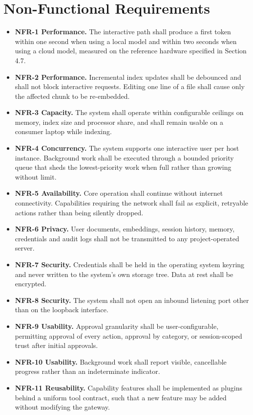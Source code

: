 \documentclass{FastFyp}
\begin{document}
\section{Non-Functional Requirements}
\begin{itemize}
    \item \textbf{NFR-1 Performance.} The interactive path shall produce a first token within one second when using a local model and within two seconds when using a cloud model, measured on the reference hardware specified in Section 4.7.
    \item \textbf{NFR-2 Performance.} Incremental index updates shall be debounced and shall not block interactive requests. Editing one line of a file shall cause only the affected chunk to be re-embedded.
    \item \textbf{NFR-3 Capacity.} The system shall operate within configurable ceilings on memory, index size and processor share, and shall remain usable on a consumer laptop while indexing.
    \item \textbf{NFR-4 Concurrency.} The system supports one interactive user per host instance. Background work shall be executed through a bounded priority queue that sheds the lowest-priority work when full rather than growing without limit.
    \item \textbf{NFR-5 Availability.} Core operation shall continue without internet connectivity. Capabilities requiring the network shall fail as explicit, retryable actions rather than being silently dropped.
    \item \textbf{NFR-6 Privacy.} User documents, embeddings, session history, memory, credentials and audit logs shall not be transmitted to any project-operated server.
    \item \textbf{NFR-7 Security.} Credentials shall be held in the operating system keyring and never written to the system's own storage tree. Data at rest shall be encrypted.
    \item \textbf{NFR-8 Security.} The system shall not open an inbound listening port other than on the loopback interface.
    \item \textbf{NFR-9 Usability.} Approval granularity shall be user-configurable, permitting approval of every action, approval by category, or session-scoped trust after initial approvals.
    \item \textbf{NFR-10 Usability.} Background work shall report visible, cancellable progress rather than an indeterminate indicator.
    \item \textbf{NFR-11 Reusability.} Capability features shall be implemented as plugins behind a uniform tool contract, such that a new feature may be added without modifying the gateway.

\end{itemize}
\end{document}
